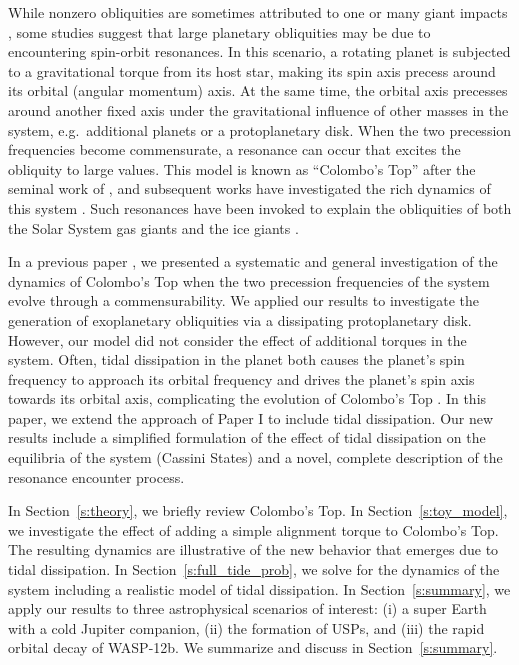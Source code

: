 \documentclass[
        fleqn,
        usenatbib,
    ]{mnras}
\begin{document}
While nonzero obliquities are sometimes attributed to one or many giant impacts
\citep[e.g.]{original_gi, benz1989tilting, korycansky1990one, morbidelli_gi},
some studies suggest that large planetary obliquities may be due to encountering
spin-orbit resonances. In this scenario, a rotating planet is subjected to a
gravitational torque from its host star, making its spin axis precess around its
orbital (angular momentum) axis. At the same time, the orbital axis precesses
around another fixed axis under the gravitational influence of other masses in
the system, e.g.\ additional planets or a protoplanetary disk. When the two
precession frequencies become commensurate, a resonance can occur that excites
the obliquity to large values. This model is known as ``Colombo's Top'' after
the seminal work of \citet{colombo1966}, and subsequent works have investigated
the rich dynamics of this system \citep{peale1969, peale1974possible,
ward1975tidal, henrard1987}. Such resonances have been invoked to explain the
obliquities of both the Solar System gas giants \citep{ward2004I, ward2004II,
ward_jupiter, vokrouhlicky2015tilting, saillenfest2020future,
saillenfest2021large} and the ice giants \citep{hamilton_tilting_ice}.

In a previous paper \citep[hereafter Paper I]{su2020}, we presented a systematic
and general investigation of the dynamics of Colombo's Top when the two
precession frequencies of the system evolve through a commensurability. We
applied our results to investigate the generation of exoplanetary obliquities
via a dissipating protoplanetary disk. However, our model did not consider the
effect of additional torques in the system. Often, tidal dissipation in the
planet both causes the planet's spin frequency to approach its orbital frequency
and drives the planet's spin axis towards its orbital axis, complicating the
evolution of Colombo's Top \citep{fabrycky_otides, peale2008obliquity}. In this
paper, we extend the approach of Paper I to include tidal dissipation. Our new
results include a simplified formulation of the effect of tidal dissipation on
the equilibria of the system (Cassini States) and a novel, complete description
of the resonance encounter process.

In Section~\ref{s:theory}, we briefly review Colombo's Top. In
Section~\ref{s:toy_model}, we investigate the effect of adding a simple
alignment torque to Colombo's Top. The resulting dynamics are illustrative of
the new behavior that emerges due to tidal dissipation. In
Section~\ref{s:full_tide_prob}, we solve for the dynamics of the system
including a realistic model of tidal dissipation. In Section~\ref{s:summary}, we
apply our results to three astrophysical scenarios of interest: (i) a super
Earth with a cold Jupiter companion, (ii) the formation of USPs, and (iii) the
rapid orbital decay of WASP-12b. We summarize and discuss in
Section~\ref{s:summary}.
\end{document}

